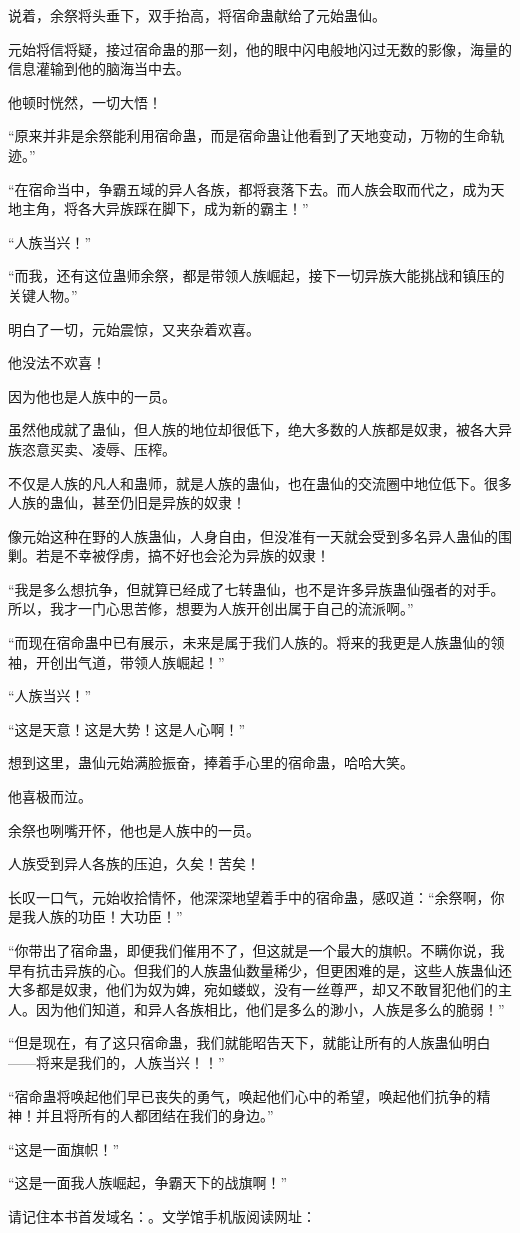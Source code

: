 \begin{this_body}
说着，余祭将头垂下，双手抬高，将宿命蛊献给了元始蛊仙。

元始将信将疑，接过宿命蛊的那一刻，他的眼中闪电般地闪过无数的影像，海量的信息灌输到他的脑海当中去。

他顿时恍然，一切大悟！

“原来并非是余祭能利用宿命蛊，而是宿命蛊让他看到了天地变动，万物的生命轨迹。”

“在宿命当中，争霸五域的异人各族，都将衰落下去。而人族会取而代之，成为天地主角，将各大异族踩在脚下，成为新的霸主！”

“人族当兴！”

“而我，还有这位蛊师余祭，都是带领人族崛起，接下一切异族大能挑战和镇压的关键人物。”

明白了一切，元始震惊，又夹杂着欢喜。

他没法不欢喜！

因为他也是人族中的一员。

虽然他成就了蛊仙，但人族的地位却很低下，绝大多数的人族都是奴隶，被各大异族恣意买卖、凌辱、压榨。

不仅是人族的凡人和蛊师，就是人族的蛊仙，也在蛊仙的交流圈中地位低下。很多人族的蛊仙，甚至仍旧是异族的奴隶！

像元始这种在野的人族蛊仙，人身自由，但没准有一天就会受到多名异人蛊仙的围剿。若是不幸被俘虏，搞不好也会沦为异族的奴隶！

“我是多么想抗争，但就算已经成了七转蛊仙，也不是许多异族蛊仙强者的对手。所以，我才一门心思苦修，想要为人族开创出属于自己的流派啊。”

“而现在宿命蛊中已有展示，未来是属于我们人族的。将来的我更是人族蛊仙的领袖，开创出气道，带领人族崛起！”

“人族当兴！”

“这是天意！这是大势！这是人心啊！”

想到这里，蛊仙元始满脸振奋，捧着手心里的宿命蛊，哈哈大笑。

他喜极而泣。

余祭也咧嘴开怀，他也是人族中的一员。

人族受到异人各族的压迫，久矣！苦矣！

长叹一口气，元始收拾情怀，他深深地望着手中的宿命蛊，感叹道：“余祭啊，你是我人族的功臣！大功臣！”

“你带出了宿命蛊，即便我们催用不了，但这就是一个最大的旗帜。不瞒你说，我早有抗击异族的心。但我们的人族蛊仙数量稀少，但更困难的是，这些人族蛊仙还大多都是奴隶，他们为奴为婢，宛如蝼蚁，没有一丝尊严，却又不敢冒犯他们的主人。因为他们知道，和异人各族相比，他们是多么的渺小，人族是多么的脆弱！”

“但是现在，有了这只宿命蛊，我们就能昭告天下，就能让所有的人族蛊仙明白——将来是我们的，人族当兴！！”

“宿命蛊将唤起他们早已丧失的勇气，唤起他们心中的希望，唤起他们抗争的精神！并且将所有的人都团结在我们的身边。”

“这是一面旗帜！”

“这是一面我人族崛起，争霸天下的战旗啊！”

请记住本书首发域名：。文学馆手机版阅读网址：

\end{this_body}

